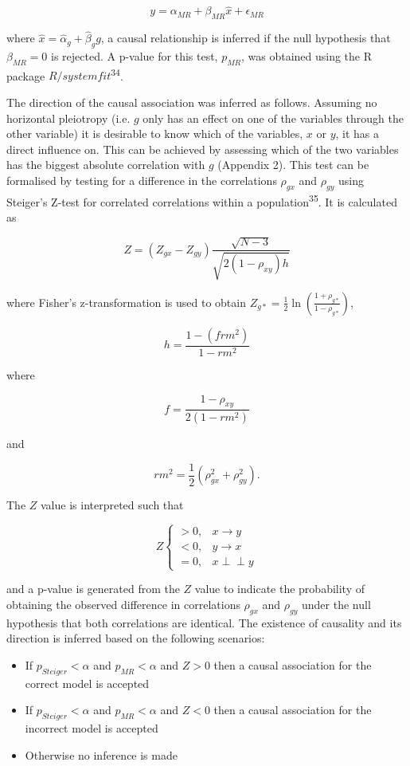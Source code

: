 \documentclass[]{article}
\begin{document}
\[
y = \alpha_{MR} + \beta_{MR} \hat{x} + \epsilon_{MR}
\]

where \(\hat{x} = \hat{\alpha}_g + \hat{\beta}_g g\), a causal
relationship is inferred if the null hypothesis that \(\beta_{MR} = 0\)
is rejected. A p-value for this test, \(p_{MR}\), was obtained using the
R package \(R/systemfit\)\textsuperscript{34}.

The direction of the causal association was inferred as follows.
Assuming no horizontal pleiotropy (i.e. \(g\) only has an effect on one
of the variables through the other variable) it is desirable to know
which of the variables, \(x\) or \(y\), it has a direct influence on.
This can be achieved by assessing which of the two variables has the
biggest absolute correlation with \(g\) (Appendix 2). This test can be
formalised by testing for a difference in the correlations \(\rho_{gx}\)
and \(\rho_{gy}\) using Steiger's Z-test for correlated correlations
within a population\textsuperscript{35}. It is calculated as

\[
Z = (Z_{gx} - Z_{gy}) \frac{\sqrt{N-3}}{\sqrt{2(1-\rho_{xy})h}}
\]

where Fisher's z-transformation is used to obtain
\(Z_{g*} = \frac{1}{2} \ln \left ( \frac{1+\rho_{g*}}{1-\rho_{g*}} \right )\),

\[
h = \frac{1 - (frm^2)} {1 - rm^2}
\]

where

\[
f = \frac{1 - \rho_{xy}}{2(1 - rm^2)}
\]

and

\[
rm^2 = \frac{1}{2}(\rho_{gx}^2 + \rho_{gy}^2).
\]

The \(Z\) value is interpreted such that

\[
Z \left\{
\begin{array}{ll}
> 0, & x \to y\\
< 0, & y \to x\\
= 0, & x \perp\!\!\!\perp y 
\end{array} \right.
\]

and a p-value is generated from the \(Z\) value to indicate the
probability of obtaining the observed difference in correlations
\(\rho_{gx}\) and \(\rho_{gy}\) under the null hypothesis that both
correlations are identical. The existence of causality and its direction
is inferred based on the following scenarios:

\begin{itemize}
\itemsep1pt\parskip0pt
\item
  If \(p_{Steiger} < \alpha\) and \(p_{MR} < \alpha\) and \(Z > 0\) then
  a causal association for the correct model is accepted
\item
  If \(p_{Steiger} < \alpha\) and \(p_{MR} < \alpha\) and \(Z < 0\) then
  a causal association for the incorrect model is accepted
\item
  Otherwise no inference is made
\end{itemize}
\end{document}
